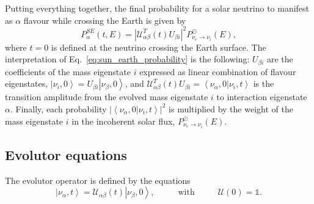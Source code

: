 \documentclass{article}
\newcommand{\ket}[1]{\left| #1 \right>}
\newcommand{\bra}[1]{\left< #1 \right|}
\newcommand{\braket}[2]{\left< #1 | #2 \right>}
\begin{document}
Putting everything together, the final probability for a solar neutrino to manifest as $\alpha$ flavour while crossing the Earth is given by
\begin{equation}\label{eq:sun_earth_probability}
	P_\alpha^{SE}(t, E) = \left| \mathcal{U}_{\alpha \beta}^T(t) U_{\beta i} \right|^2  P_{\nu_e \rightarrow \nu_i}^\odot(E),
\end{equation}
where $t=0$ is defined at the neutrino crossing the Earth surface.
The interpretation of Eq.~\ref{eq:sun_earth_probability} is the following: $U_{\beta i}$ are the coefficients of the mass eigenstate $i$ expressed as linear combination of flavour eigenstates, $\ket{\nu_i, 0} = U_{\beta i} \ket{\nu_\beta, 0}$, and $\mathcal{U}^T_{\alpha \beta}(t) U_{\beta i} = \braket{\nu_\alpha, 0}{\nu_i, t}$ is the transition amplitude from the evolved mass eigenstate $i$ to interaction eigenstate $\alpha$. Finally, each probability $|\braket{\nu_\alpha, 0}{\nu_i, t}|^2$ is multiplied by the weight of the mass eigenstate $i$ in the incoherent solar flux, $P_{\nu_e \rightarrow \nu_i}^\odot(E)$.


\subsection{Evolutor equations}

The evolutor operator is defined by the equations
\begin{equation}
	\ket{\nu_\alpha, t} = \mathcal{U}_{\alpha \beta}(t) \ket{\nu_\beta, 0}, \hspace{1cm} \text{ with } \hspace{1cm} \mathcal{U}(0) = \mathbb{1}.
\end{equation}
\end{document}

